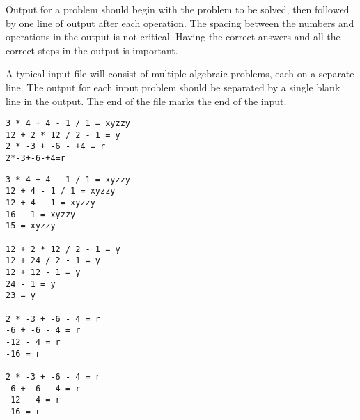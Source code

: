 Output for a problem should begin with the problem to be solved, then
followed by one line of output after each operation.  The spacing
between the numbers and operations in the output is not critical.
Having the correct answers and all the correct steps in the output is
important.

A typical input file will consist of multiple algebraic problems, each
on a separate line.  The output for each input problem should be
separated by a single blank line in the output.  The end of the file
marks the end of the input.

\bigskip
{}

{\small
\begin{verbatim}
3 * 4 + 4 - 1 / 1 = xyzzy
12 + 2 * 12 / 2 - 1 = y
2 * -3 + -6 - +4 = r
2*-3+-6-+4=r
\end{verbatim}
}

\bigskip
{}

{\small
\begin{verbatim}
3 * 4 + 4 - 1 / 1 = xyzzy
12 + 4 - 1 / 1 = xyzzy
12 + 4 - 1 = xyzzy
16 - 1 = xyzzy
15 = xyzzy

12 + 2 * 12 / 2 - 1 = y
12 + 24 / 2 - 1 = y
12 + 12 - 1 = y
24 - 1 = y
23 = y

2 * -3 + -6 - 4 = r
-6 + -6 - 4 = r
-12 - 4 = r
-16 = r

2 * -3 + -6 - 4 = r
-6 + -6 - 4 = r
-12 - 4 = r
-16 = r
\end{verbatim}
}



